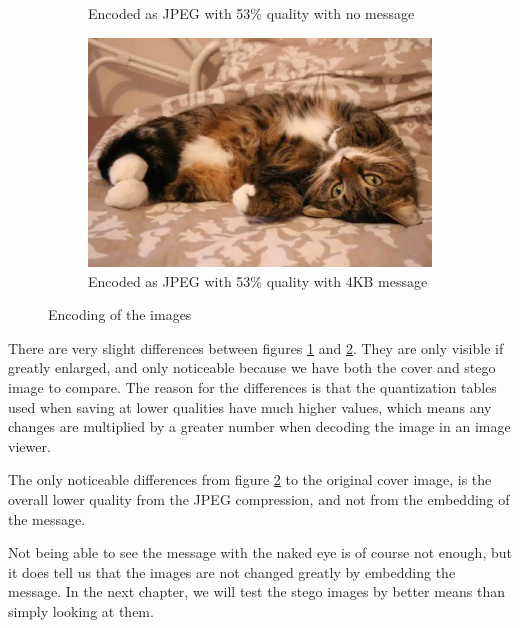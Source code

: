 \begin{figure}[H]
\begin{subfigure}[b]{0.45\textwidth}
        \caption{Encoded as JPEG with 53\% quality with no message}
        \label{fig:catJPEGNoMessage}
    \end{subfigure}
    \begin{subfigure}[b]{0.45\textwidth}
        \includegraphics[width=\textwidth]{figures/catToTestWithMessage.jpeg}
        \caption{Encoded as JPEG with 53\% quality with 4KB message}
        \label{fig:catJPEGMessage}
    \end{subfigure}
    \caption{Encoding of the images \citep{FlickrImageCat}}
    \label{fig:ResultEncoding}
\end{figure}


There are very slight differences between figures \ref{fig:catJPEGNoMessage} and \ref{fig:catJPEGMessage}. They are only visible if greatly enlarged, and only noticeable because we have both the cover and stego image to compare. The reason for the differences is that the quantization tables used when saving at lower qualities have much higher values, which means any changes are multiplied by a greater number when decoding the image in an image viewer. 

The only noticeable differences from figure \ref{fig:catJPEGMessage} to the original cover image, is the overall lower quality from the JPEG compression, and not from the embedding of the message.

Not being able to see the message with the naked eye is of course not enough, but it does tell us that the images are not changed greatly by embedding the message.
In the next chapter, we will test the stego images by better means than simply looking at them. 